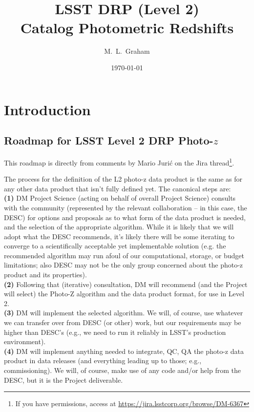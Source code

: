\documentclass[DM,lsstdraft,toc]{lsstdoc}
\title[LSST Photo-$z$]{LSST DRP (Level 2) \\ Catalog Photometric Redshifts}
\author{M.~L.~Graham}
\date{\today}
\begin{document}
\maketitle




\section{Introduction} \label{sec:intro}

\subsection{Roadmap for LSST Level 2 DRP Photo-$z$}\label{ssec:intro_roadmap}

This roadmap is directly from comments by Mario Juri\'{c} on the Jira thread\footnote{If you have permissions, access at \url{https://jira.lsstcorp.org/browse/DM-6367}}.

The process for the definition of the L2 photo-z data product is the same as for any other data product that isn't fully defined yet. The canonical steps are: \\ \textbf{(1)} DM Project Science (acting on behalf of overall Project Science) consults with the community (represented by the relevant collaboration -- in this case, the DESC) for options and proposals as to what form of the data product is needed, and the selection of the appropriate algorithm. While it is likely that we will adopt what the DESC recommends, it's likely there will be some iterating to converge to a scientifically acceptable yet implementable solution (e.g. the recommended algorithm may run afoul of our computational, storage, or budget limitations; also DESC may not be the only group concerned about the photo-z product and its properties). \\ \textbf{(2)} Following that (iterative) consultation, DM will recommend (and the Project will select) the Photo-Z algorithm and the data product format, for use in Level 2. \\ \textbf{(3)} DM will implement the selected algorithm. We will, of course, use whatever we can transfer over from DESC (or other) work, but our requirements may be higher than DESC's (e.g., we need to run it reliably in LSST's production environment). \\ \textbf{(4)} DM will implement anything needed to integrate, QC, QA the photo-z data product in data releases (and everything leading up to those; e.g., commissioning). We will, of course, make use of any code and/or help from the DESC, but it is the Project deliverable.
\end{document}
